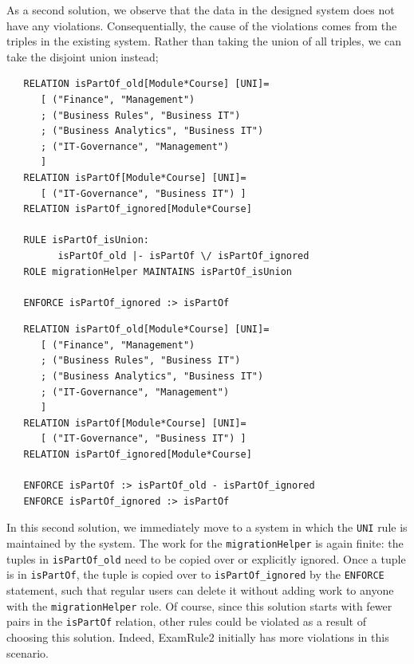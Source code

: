 \documentclass{elsarticle}
\begin{document}
As a second solution, we observe that the data in the designed system does not have any violations.
Consequentially, the cause of the violations comes from the triples in the existing system.
Rather than taking the union of all triples, we can take the disjoint union instead;
\begin{verbatim}
   RELATION isPartOf_old[Module*Course] [UNI]=
      [ ("Finance", "Management")
      ; ("Business Rules", "Business IT")
      ; ("Business Analytics", "Business IT")
      ; ("IT-Governance", "Management")
      ]
   RELATION isPartOf[Module*Course] [UNI]=
      [ ("IT-Governance", "Business IT") ]
   RELATION isPartOf_ignored[Module*Course]
   
   RULE isPartOf_isUnion:
         isPartOf_old |- isPartOf \/ isPartOf_ignored
   ROLE migrationHelper MAINTAINS isPartOf_isUnion
   
   ENFORCE isPartOf_ignored :> isPartOf
\end{verbatim}

\begin{verbatim}
   RELATION isPartOf_old[Module*Course] [UNI]=
      [ ("Finance", "Management")
      ; ("Business Rules", "Business IT")
      ; ("Business Analytics", "Business IT")
      ; ("IT-Governance", "Management")
      ]
   RELATION isPartOf[Module*Course] [UNI]=
      [ ("IT-Governance", "Business IT") ]
   RELATION isPartOf_ignored[Module*Course]

   ENFORCE isPartOf :> isPartOf_old - isPartOf_ignored
   ENFORCE isPartOf_ignored :> isPartOf
\end{verbatim}
In this second solution, we immediately move to a system in which the \verb=UNI= rule is maintained by the system.
The work for the \verb=migrationHelper= is again finite: the tuples in \verb=isPartOf_old= need to be copied over or explicitly ignored.
Once a tuple is in \verb=isPartOf=, the tuple is copied over to \verb=isPartOf_ignored= by the \verb=ENFORCE= statement, such that regular users can delete it without adding work to anyone with the \verb=migrationHelper= role.
Of course, since this solution starts with fewer pairs in the \verb=isPartOf= relation, other rules could be violated as a result of choosing this solution.
Indeed, ExamRule2 initially has more violations in this scenario.
\end{document}
